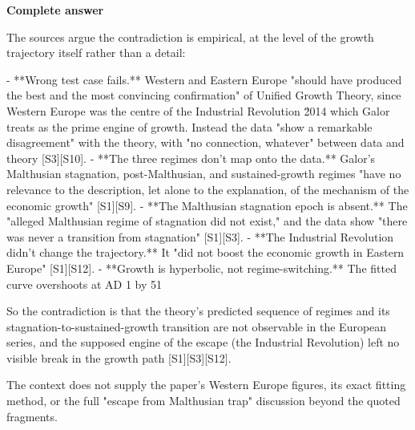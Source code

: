 \documentclass[10pt]{article}
\begin{document}
\textbf{Complete answer}
\begin{AnswerText}
The sources argue the contradiction is empirical, at the level of the growth trajectory itself rather than a detail:

- **Wrong test case fails.** Western and Eastern Europe "should have produced the best and the most convincing confirmation" of Unified Growth Theory, since Western Europe was the centre of the Industrial Revolution \u2014 which Galor treats as the prime engine of growth. Instead the data "show a remarkable disagreement" with the theory, with "no connection, whatever" between data and theory [S3][S10].
- **The three regimes don't map onto the data.** Galor's Malthusian stagnation, post-Malthusian, and sustained-growth regimes "have no relevance to the description, let alone to the explanation, of the mechanism of the economic growth" [S1][S9].
- **The Malthusian stagnation epoch is absent.** The "alleged Malthusian regime of stagnation did not exist," and the data show "there was never a transition from stagnation" [S1][S3].
- **The Industrial Revolution didn't change the trajectory.** It "did not boost the economic growth in Eastern Europe" [S1][S12].
- **Growth is hyperbolic, not regime-switching.** The fitted curve overshoots at AD 1 by 51%

So the contradiction is that the theory's predicted sequence of regimes and its stagnation-to-sustained-growth transition are not observable in the European series, and the supposed engine of the escape (the Industrial Revolution) left no visible break in the growth path [S1][S3][S12].

The context does not supply the paper's Western Europe figures, its exact fitting method, or the full "escape from Malthusian trap" discussion beyond the quoted fragments.
\end{AnswerText}
\end{document}
